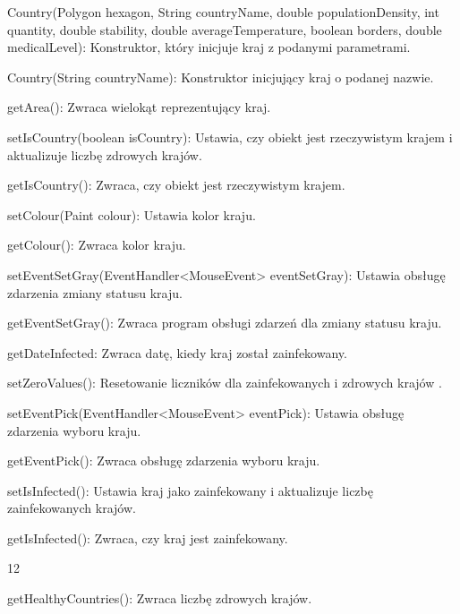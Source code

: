 \documentclass[a4paper]{article}
\begin{document}
\foreignlanguage{english}{Country(Polygon hexagon, String countryName, double populationDensity, int quantity, double
stability, double averageTemperature, boolean borders, double medicalLevel): Konstruktor, który inicjuje kraj z
podanymi parametrami.}

\foreignlanguage{polish}{Country(String countryName): Konstruktor inicjujący kraj o podanej nazwie.}

\foreignlanguage{polish}{getArea(): Zwraca wielokąt reprezentujący kraj.}

\foreignlanguage{polish}{setIsCountry(boolean isCountry): Ustawia, czy obiekt jest rzeczywistym krajem i aktualizuje
liczbę zdrowych krajów.}

\foreignlanguage{polish}{getIsCountry(): Zwraca, czy obiekt jest rzeczywistym krajem.}

\foreignlanguage{english}{setColour(Paint colour): Ustawia kolor kraju.}

\foreignlanguage{english}{getColour(): Zwraca kolor kraju.}

\foreignlanguage{english}{setEventSetGray(EventHandler{\textless}MouseEvent{\textgreater} eventSetGray): Ustawia obsługę
zdarzenia zmiany statusu kraju.}

\foreignlanguage{polish}{getEventSetGray(): Zwraca program obsługi zdarzeń dla zmiany statusu kraju.}

\foreignlanguage{polish}{getDateInfected: Zwraca datę, kiedy kraj został zainfekowany.}

\foreignlanguage{polish}{setZeroValues(): Resetowanie liczników dla zainfekowanych i zdrowych krajów .}

\foreignlanguage{polish}{setEventPick(EventHandler{\textless}MouseEvent{\textgreater} eventPick): Ustawia obsługę
zdarzenia wyboru kraju.}

\foreignlanguage{polish}{getEventPick(): Zwraca obsługę zdarzenia wyboru kraju.}

\foreignlanguage{polish}{setIsInfected(): Ustawia kraj jako zainfekowany i aktualizuje liczbę zainfekowanych krajów.}

\foreignlanguage{polish}{getIsInfected(): Zwraca, czy kraj jest zainfekowany.}
\begin{center}
	12
\end{center}
\newpage

\foreignlanguage{polish}{getHealthyCountries(): Zwraca liczbę zdrowych krajów.}
\end{document}
